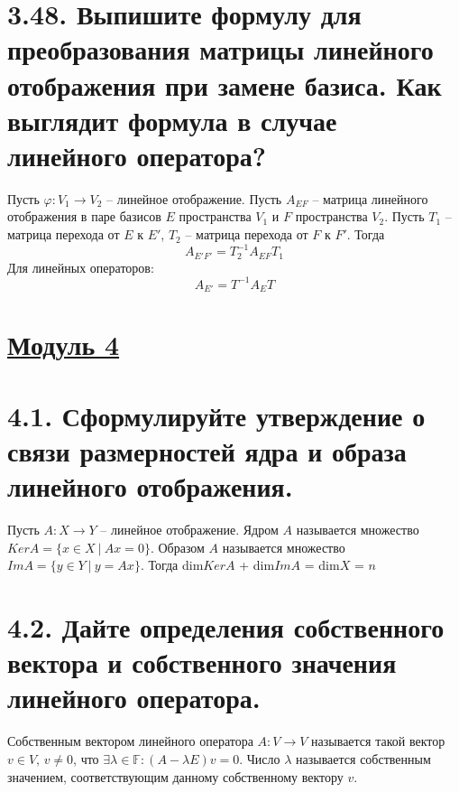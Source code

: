 \documentclass{article}
\begin{document}
\section*{\LARGE 3.48. Выпишите формулу для преобразования матрицы линейного отображения при замене базиса. Как выглядит формула в случае линейного оператора?}
Пусть $\varphi : V_1 \rightarrow V_2$ -- линейное отображение. Пусть $A_{EF}$ -- матрица линейного отображения в паре базисов $E$ пространства $V_1$ и $F$ пространства $V_2$. Пусть $T_1$ -- матрица перехода от $E$ к $E'$, $T_2$ --  матрица перехода от $F$ к $F'$. Тогда 
$$
A_{E'F'} = T_2^{-1}A_{EF}T_1
$$
Для линейных операторов:
$$
A_{E'} = T^{-1}A_ET
$$

\newpage
{}
\section*{\LARGE\centering \underline{Модуль 4}}

\section*{\LARGE 4.1. Сформулируйте утверждение о связи размерностей ядра и образа линейного отображения.}
Пусть $A : X \rightarrow Y$ -- линейное отображение.
\newline Ядром $A$ называется множество $KerA = \{x \in X \:|\: Ax = 0\}$. 
\newline Образом $A$ называется множество $ImA = \{y \in Y \:|\: y = Ax\}$.
\newline Тогда dim$KerA$ + dim$ImA$ = dim$X$ = $n$

\section*{\LARGE 4.2. Дайте определения собственного вектора и собственного значения линейного оператора.}
Собственным вектором линейного оператора $A : V \rightarrow V$ называется такой вектор $v \in V,\, v \ne 0$, что $\exists \lambda \in \mathbb{F} : (A - \lambda E)v = 0$. Число $\lambda$ называется собственным значением, соответствующим данному собственному вектору $v$.
\end{document}
